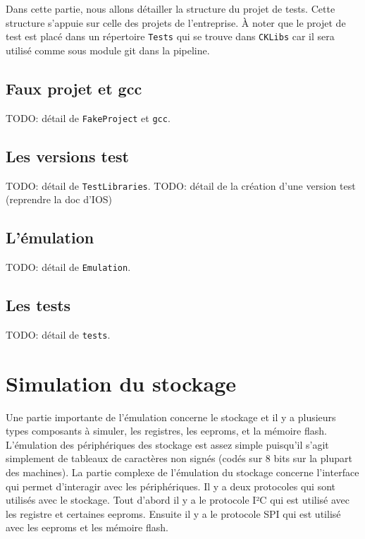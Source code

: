 \documentclass[a4paper]{article}
\begin{document}
Dans cette partie, nous allons détailler la structure du projet de tests. Cette
structure s'appuie sur celle des projets de l'entreprise. À noter que le projet
de test est placé dans un répertoire \lstinline{Tests} qui se trouve dans
\lstinline{CKLibs} car il sera utilisé comme sous module git dans la pipeline.

\subsection{Faux projet et gcc}

TODO: détail de \lstinline{FakeProject} et \lstinline{gcc}.

\subsection{Les versions test}

TODO: détail de \lstinline{TestLibraries}.
TODO: détail de la création d'une version test (reprendre la doc d'IOS)

\subsection{L'émulation}

TODO: détail de \lstinline{Emulation}.

\subsection{Les tests}

TODO: détail de \lstinline{tests}.

\section{Simulation du stockage}

Une partie importante de l'émulation concerne le stockage et il y a plusieurs
types composants à simuler, les registres, les eeproms, et la mémoire flash.
L'émulation des périphériques des stockage est assez simple puisqu'il s'agit
simplement de tableaux de caractères non signés (codés sur 8 bits sur la plupart
des machines). La partie complexe de l'émulation du stockage concerne
l'interface qui permet d'interagir avec les périphériques. Il y a deux
protocoles qui sont utilisés avec le stockage. Tout d'abord il y a le protocole
I²C qui est utilisé avec les registre et certaines eeproms. Ensuite il y a le
protocole SPI qui est utilisé avec les eeproms et les mémoire flash.
\end{document}
